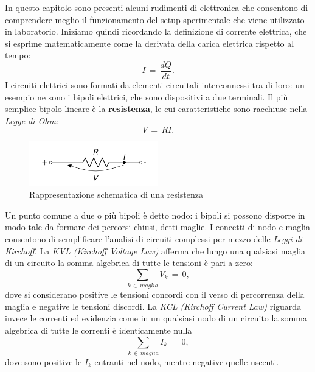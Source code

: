 In questo capitolo sono presenti alcuni rudimenti di elettronica che consentono di comprendere meglio il funzionamento del
setup sperimentale che viene utilizzato in laboratorio. Iniziamo quindi ricordando la definizione di corrente elettrica, che
si esprime matematicamente come la derivata della carica elettrica rispetto al tempo:
\begin{equation}
    I\,=\,\frac{dQ}{dt}.
    \label{equation: current}
\end{equation}
I circuiti elettrici sono formati da elementi circuitali interconnessi tra di loro: un esempio ne sono i bipoli elettrici, 
che sono dispositivi a due terminali. Il più semplice bipolo lineare è la \textbf{resistenza}, le cui caratteristiche sono racchiuse
nella \textit{Legge di Ohm}:
\begin{equation}
    V\,=\,RI.
    \label{equation: OhmLaw}
\end{equation}
\begin{figure}[H]
    \centering
    \includegraphics[width=0.5\textwidth]{Immagini/Resistenza.png}
    \caption{Rappresentazione schematica di una resistenza}
    \label{figure: resistenza}
\end{figure}
Un punto comune a due o più bipoli è detto nodo: i bipoli si possono disporre in modo tale da formare dei percorsi chiusi,
detti maglie. I concetti di nodo e maglia consentono di semplificare l'analisi di circuiti complessi per mezzo delle 
\textit{Leggi di Kirchoff}. La \textit{KVL (Kirchoff Voltage Law)} afferma che lungo una qualsiasi maglia di un circuito
la somma algebrica di tutte le tensioni è pari a zero:
\begin{equation}
    \sum_{k\,\in\,maglia}V_k\,=\,0,
    \label{equation: KVL}
\end{equation}
dove si considerano positive le tensioni concordi con il verso di percorrenza della maglia e negative le tensioni discordi.
La \textit{KCL (Kirchoff Current Law)} riguarda invece le correnti ed evidenzia come in un qualsiasi nodo di un circuito
la somma algebrica di tutte le correnti è identicamente nulla
\begin{equation}
    \sum_{k\,\in\,maglia}I_k\,=\,0,
    \label{equation: KCL}
\end{equation}
dove sono positive le $I_k$ entranti nel nodo, mentre negative quelle uscenti.
